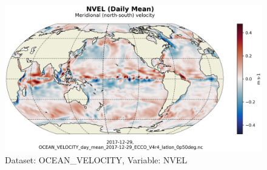 \begin{figure}[H]
\centering
\includegraphics[scale=0.55]{../images/plots/latlon_plots/Ocean_Velocity/NVEL.png}
\caption{Dataset: OCEAN\_VELOCITY, Variable: NVEL}
\label{tab:table-OCEAN_VELOCITY_NVEL-Plot}
\end{figure}
\pagebreak
